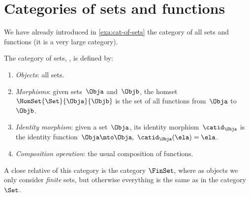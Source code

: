 
\section{Categories of sets and functions}

We have already introduced in \cref{exa:cat-of-sets} the category of all sets and functions (it is a very large category). 

\begin{ctdefinition}
    \label{def:Set}
    The category of sets, \iindex{\Set}, is defined by:
    \begin{enumerate}
        \item \emph{Objects}: all sets.
        \item \emph{Morphisms}: given sets~$\Obja$ and~$\Objb$, the homset~$\HomSet{\Set}{\Obja}{\Objb}$ is the set of all functions from~$\Obja$ to~$\Objb$.
        \item \emph{Identity morphism}: given a set~$\Obja$, its identity morphism~$\catid_\Obja$ is the identity function~$\Obja \mto \Obja, \ \catid_\Obja(\ela) = \ela$.
        \item \emph{Composition operation}: the usual composition of functions.
    \end{enumerate}
\end{ctdefinition}

A close relative of this category is the category $\FinSet$, where as objects we only consider \emph{finite} sets, but otherwise everything is the same as in the category $\Set$. 
